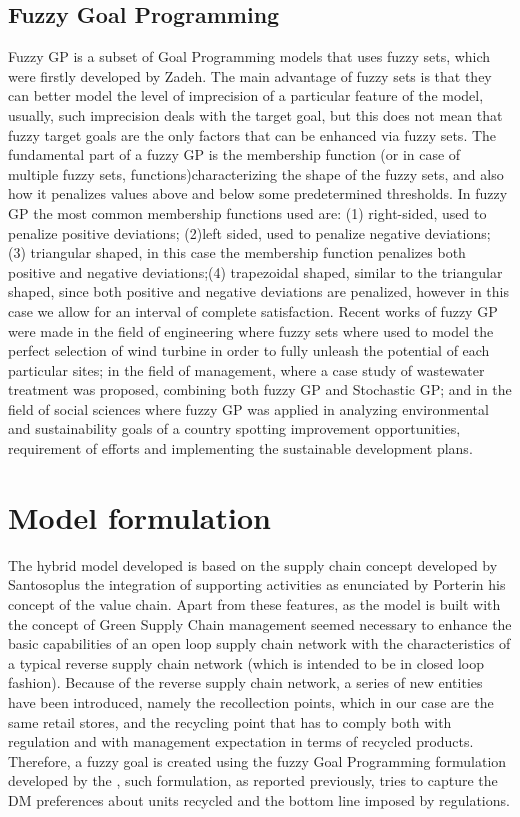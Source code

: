 \begin{doublespace}
  \subsection{Fuzzy Goal Programming}
  Fuzzy GP is a subset of Goal Programming models that uses fuzzy sets, which were firstly developed by Zadeh\cite{Zadeh1965}. The main advantage of fuzzy sets is that they can better model the level of imprecision of a particular feature of the model, usually, such imprecision deals with the target goal, but this does not mean that fuzzy target goals are the only factors that can be enhanced via fuzzy sets. The fundamental part of a fuzzy GP is the membership function (or in case of multiple fuzzy sets, functions)characterizing the shape of the fuzzy sets, and also how it penalizes values above and below some predetermined thresholds. In fuzzy GP the most common membership functions used are: (1) right-sided, used to penalize positive deviations; (2)left sided, used to penalize negative deviations; (3) triangular shaped, in this case the membership function penalizes both positive and negative deviations;(4) trapezoidal shaped, similar to the triangular shaped, since both positive and negative deviations are penalized, however in this case we allow for an interval of complete satisfaction.
  Recent works of fuzzy GP were made in the field of engineering where fuzzy sets where used to model the perfect selection of wind turbine in order to fully unleash the potential of each particular sites\cite{Rehman2017}; in the field of management, where a case study of wastewater treatment was proposed, combining both fuzzy GP and Stochastic GP\cite{Diaz-Madronero2018}; and in the field of social sciences where fuzzy GP was applied in analyzing environmental and sustainability goals of a country spotting improvement opportunities, requirement of efforts and implementing the sustainable development plans\cite{Nomani2016}.   
  \pagebreak

\section{Model formulation}
The hybrid model developed is based on the supply chain concept developed by Santoso\cite{Santoso2005}plus the integration of supporting activities as enunciated by Porter\cite{Porter1998}in his concept of the value chain. Apart from these features, as the model is built with the concept of Green Supply Chain management seemed necessary to enhance the basic capabilities of an open loop supply chain network with the characteristics of a typical reverse supply chain network (which is intended to be in closed loop fashion). Because of the reverse supply chain network, a series of new entities have been introduced, namely the recollection points, which in our case are the same retail stores, and the recycling point that has to comply both with regulation and with management expectation in terms of recycled products. Therefore, a fuzzy goal is created using the fuzzy Goal Programming formulation developed by the \cite{Yaghoobi2008}, such formulation, as reported previously, tries to capture the DM preferences about units recycled and the bottom line imposed by regulations.


\end{doublespace}
